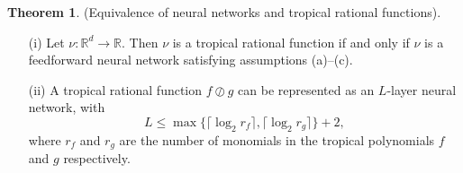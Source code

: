 \documentclass{article}
\theoremstyle{definition}
\newtheorem{theorem}{Theorem}[section]
\begin{document}
\begin{theorem}\cite{zhang2018tropical}
(Equivalence of neural networks and tropical
rational functions).
\begin{itemize}
\item[(i)]
Let $\nu : \mathbb{R}^{d} \to \mathbb{R}$. Then $\nu$ is a tropical rational function if and only if $\nu$ is a feedforward neural network satisfying assumptions (a)–(c).
\item[(ii)]
A tropical rational function $f \oslash g$ can be represented as an $L$-layer neural network, with
$$ L \leq \max \{ \lceil \log_2 r_f \rceil, \lceil \log_2 r_g \rceil \} + 2,$$
where $r_f$ and $r_g$ are the number of monomials in the tropical polynomials $f$ and $g$ respectively.
\end{itemize}
\end{theorem}
\end{document}
